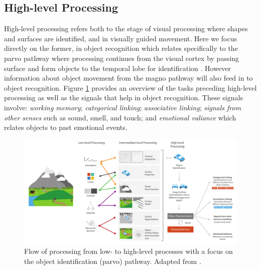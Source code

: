 \subsection{High-level Processing}

High-level processing refers both to the stage of visual processing where shapes and surfaces are identified, and in visually guided movement.
Here we focus directly on the former, in object recognition which relates specifically to the parvo pathway where processing continues from the visual cortex by passing surface and form objects to the temporal lobe for identification \cite{kandel2012principles}. 
However information about object movement from the magno pathway will also feed in to object recognition. 
Figure \ref{fig:high-level-processing} provides an overview of the tasks preceding high-level processing as well as the signals that help in object recognition. 
These signals involve:
\emph{working memory};
\emph{categorical linking};
\emph{associative linking};
\emph{signals from other senses} such as sound, smell, and touch;
and \emph{emotional valiance} which relates objects to past emotional events.

\begin{figure}[t!]
\centering
\includegraphics[width=\textwidth]{images/related-work/high-level-processing}
\caption{Flow of processing from low- to high-level processes with a focus on the object identification (parvo) pathway. Adapted from \cite{kandel2012principles}.}
\label{fig:high-level-processing}
\end{figure}

